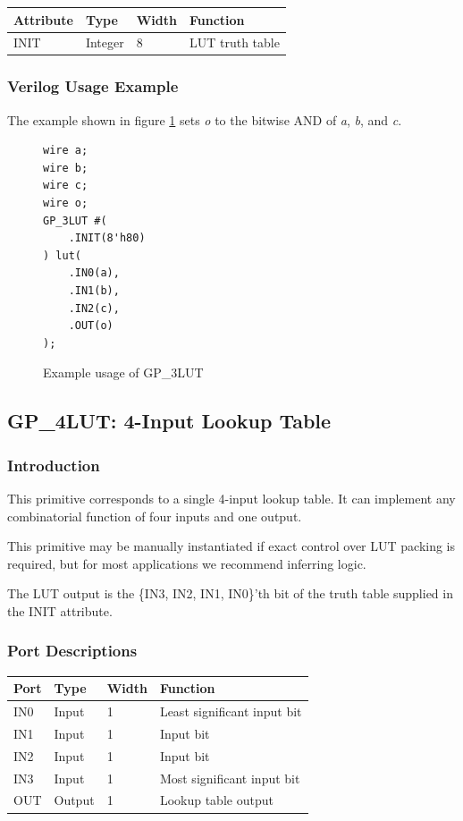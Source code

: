 \documentclass{article}
\begin{document}
\begin{tabularx}{4in}{|l|l|l|X|}
\hline
{\bfseries Attribute} & {\bfseries Type} & {\bfseries Width} & {\bfseries Function} \\
\hline
INIT & Integer & 8 & LUT truth table \\
\hline
\end{tabularx}

\subsubsection{Verilog Usage Example}

The example shown in figure \ref{gp-3LUT-example} sets \emph{o} to the bitwise AND of \emph{a}, \emph{b}, and \emph{c}.

\begin{figure}[h]
\begin{lstlisting}
wire a;
wire b;
wire c;
wire o;
GP_3LUT #(
	.INIT(8'h80)
) lut(
	.IN0(a),
	.IN1(b),
	.IN2(c),
	.OUT(o)
);
\end{lstlisting}
\caption{Example usage of GP\_3LUT}
\label{gp-3LUT-example}
\end{figure}


\pagebreak
\subsection{GP\_4LUT: 4-Input Lookup Table}

\subsubsection{Introduction}
This primitive corresponds to a single 4-input lookup table. It can implement any combinatorial function of four 
inputs and one output.

This primitive may be manually instantiated if exact control over LUT packing is required, but for most applications we 
recommend inferring logic.

The LUT output is the \{IN3, IN2, IN1, IN0\}'th bit of the truth table supplied in the INIT attribute.

\subsubsection{Port Descriptions}

\begin{tabularx}{4in}{|l|l|l|X|}
\hline
{\bfseries Port} & {\bfseries Type} & {\bfseries Width} & {\bfseries Function} \\
\hline
IN0 & Input & 1 & Least significant input bit \\
\hline
IN1 & Input & 1 & Input bit \\
\hline
IN2 & Input & 1 & Input bit \\
\hline
IN3 & Input & 1 & Most significant input bit \\
\hline
OUT & Output & 1 & Lookup table output \\
\hline
\end{tabularx}
\end{document}
